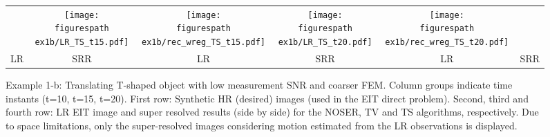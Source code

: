 \documentclass[10pt]{IEEEtran}
\newcommand{\figurespath}{figs/}
\begin{document}
\begin{figure*}[!htb]
\begin{center}
\begin{tabular}{cc||cc||cc}
  &
  \texttt{[image: \\figurespath ex1b/LR\_TS\_t15.pdf]}  &
  \texttt{[image: \\figurespath ex1b/rec\_wreg\_TS\_t15.pdf]}
  &
  \texttt{[image: \\figurespath ex1b/LR\_TS\_t20.pdf]}  &
  \texttt{[image: \\figurespath ex1b/rec\_wreg\_TS\_t20.pdf]} \\
  LR   &   SRR   &   LR   &   SRR   &   LR   &   SRR
\end{tabular}
\end{center}
\caption{Example 1-b: Translating T-shaped object with low measurement SNR and coarser FEM. Column groups indicate time instants (t=10, t=15, t=20). First row: Synthetic HR (desired) images (used in the EIT direct problem). Second, third and fourth row: LR EIT image and super resolved results (side by side) for the NOSER, TV and TS algorithms, respectively. Due to space limitations, only the super-resolved images considering motion estimated from the LR observations is displayed.}
\label{ex1b_results}
\end{figure*}
\end{document}
